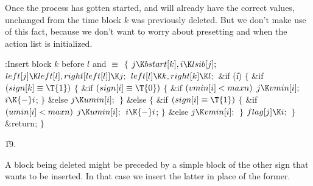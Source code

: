 Once the process has gotten started,  and  will
already have the correct values, unchanged from the time block $k$ was
previously deleted. But we don't make use of this fact, because we don't
want to worry about presetting  and  when
the
action list is initialized.

\Y\B\4:Insert block $k$ before $l$ and \X${}\equiv{}$\6
${}\{{}$\1\6
${}\|j\K\\{bstart}[\|k],\39\|i\K\\{lsib}[\|j];{}$\6
${}\\{left}[\|j]\K\\{left}[\|l],\39\\{right}[\\{left}[\|l]]\K\|j;{}$\6
${}\\{left}[\|l]\K\|k,\39\\{right}[\|k]\K\|l;{}$\6
\&{if} (\|i)\5
${}\{{}$\1\6
\&{if} ${}(\\{sign}[\|k]\E\T{1}){}$\5
${}\{{}$\1\6
\&{if} ${}(\\{sign}[\|i]\E\T{0}){}$\5
${}\{{}$\1\6
\&{if} ${}(\\{vmin}[\|i]<\\{maxn}){}$\1\5
${}\|j\K\\{vmin}[\|i];{}$\2\6
${}\|i\K{-}\|i{}$;\6
\4${}\}{}$\5
\2\&{else}\1\5
${}\|j\K\\{umin}[\|i];{}$\2\6
\4${}\}{}$\5
\2\&{else}\5
${}\{{}$\1\6
\&{if} ${}(\\{sign}[\|i]\E\T{1}){}$\5
${}\{{}$\1\6
\&{if} ${}(\\{umin}[\|i]<\\{maxn}){}$\1\5
${}\|j\K\\{umin}[\|i];{}$\2\6
${}\|i\K{-}\|i{}$;\6
\4${}\}{}$\5
\2\&{else}\1\5
${}\|j\K\\{vmin}[\|i];{}$\2\6
\4${}\}{}$\2\6
${}\\{flag}[\|j]\K\|i;{}$\6
\4${}\}{}$\2\6
\&{return};\6
\4${}\}{}$\2\par
\U19.\fi

A block being deleted might be preceded by a simple block of the
other sign that wants to be inserted. In that case we insert the latter
in place of the former.

